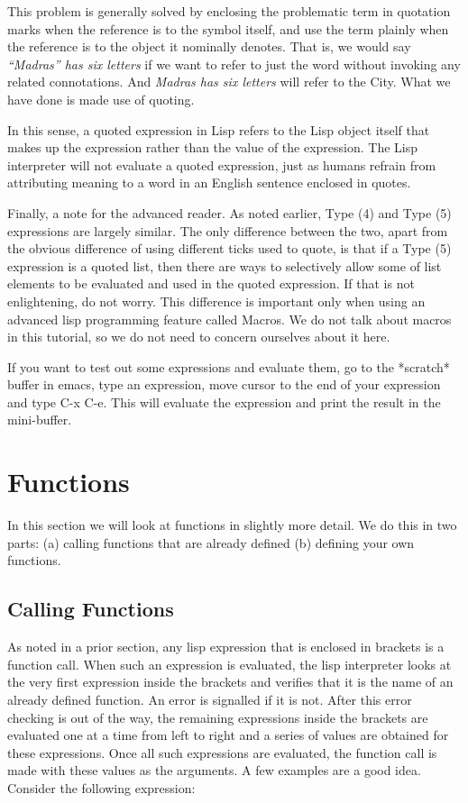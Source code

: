 \documentclass[10pt]{article}
\begin{document}
This problem is generally solved by enclosing the problematic term in quotation
marks when the reference is to the symbol itself, and use the term plainly when
the reference is to the object it nominally denotes.  That is, we would say
\textit{``Madras'' has six letters} if we want to refer to just the word
without invoking any related connotations.  And \textit{Madras has six letters}
will refer to the City.  What we have done is made use of quoting.

In this sense, a quoted expression in Lisp refers to the Lisp object itself
that makes up the expression rather than the value of the expression.  The Lisp
interpreter will not evaluate a quoted expression, just as humans refrain from
attributing meaning to a word in an English sentence enclosed in quotes.

Finally, a note for the advanced reader.  As noted earlier, Type (4) and Type
(5) expressions are largely similar.  The only difference between the two,
apart from the obvious difference of using different ticks used to quote, is
that if a Type (5) expression is a quoted list, then there are ways to
selectively allow some of list elements to be evaluated and used in the quoted
expression.  If that is not enlightening, do not worry.  This difference is
important only when using an advanced lisp programming feature called Macros.
We do not talk about macros in this tutorial, so we do not need to concern
ourselves about it here.

If you want to test out some expressions and evaluate them, go to the *scratch*
buffer in emacs, type an expression, move cursor to the end of your expression
and type C-x C-e.  This will evaluate the expression and print the result in
the mini-buffer.

\section{Functions}

In this section we will look at functions in slightly more detail.  We do this
in two parts: (a) calling functions that are already defined (b) defining your
own functions.

\subsection{Calling Functions}

As noted in a prior section, any lisp expression that is enclosed in brackets
is a function call.  When such an expression is evaluated, the lisp interpreter
looks at the very first expression inside the brackets and verifies that it is
the name of an already defined function.  An error is signalled if it is not.
After this error checking is out of the way, the remaining expressions inside
the brackets are evaluated one at a time from left to right and a series of
values are obtained for these expressions.  Once all such expressions are
evaluated, the function call is made with these values as the arguments.  A few
examples are a good idea.  Consider the following expression:
\end{document}
